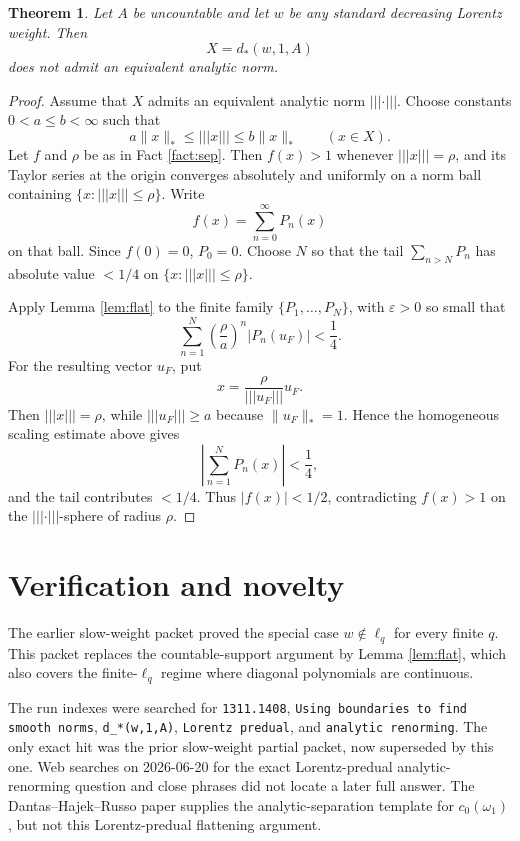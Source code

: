 \documentclass[11pt]{article}
\newtheorem{theorem}{Theorem}
\newcommand{\eps}{\varepsilon}
\newcommand{\vertiii}[1]{|\!|\!|#1|\!|\!|}
\begin{document}
\begin{theorem}\label{thm:main}
Let \(A\) be uncountable and let \(w\) be any standard decreasing Lorentz
weight.  Then
\[
  X=d_*(w,1,A)
\]
does not admit an equivalent analytic norm.
\end{theorem}

\begin{proof}
Assume that \(X\) admits an equivalent analytic norm \(\vertiii{\cdot}\).
Choose constants \(0<a\le b<\infty\) such that
\[
  a\|x\|_*\le \vertiii{x}\le b\|x\|_* \qquad(x\in X).
\]
Let \(f\) and \(\rho\) be as in Fact \ref{fact:sep}.  Then \(f(x)>1\) whenever
\(\vertiii{x}=\rho\), and its Taylor series at the origin converges absolutely
and uniformly on a norm ball containing \(\{x:\vertiii{x}\le\rho\}\).
Write
\[
  f(x)=\sum_{n=0}^\infty P_n(x)
\]
on that ball.  Since \(f(0)=0\), \(P_0=0\).  Choose \(N\) so that the tail
\(\sum_{n>N}P_n\) has absolute value \(<1/4\) on
\(\{x:\vertiii{x}\le\rho\}\).

Apply Lemma \ref{lem:flat} to the finite family
\(\{P_1,\ldots,P_N\}\), with \(\eps>0\) so small that
\[
  \sum_{n=1}^N
  \left(\frac{\rho}{a}\right)^n |P_n(u_F)|<\frac14 .
\]
For the resulting vector \(u_F\), put
\[
  x=\frac{\rho}{\vertiii{u_F}}u_F .
\]
Then \(\vertiii{x}=\rho\), while \(\vertiii{u_F}\ge a\) because
\(\|u_F\|_*=1\).  Hence the homogeneous scaling estimate above gives
\[
  \left|\sum_{n=1}^N P_n(x)\right|<\frac14,
\]
and the tail contributes \(<1/4\).  Thus \(|f(x)|<1/2\), contradicting
\(f(x)>1\) on the \(\vertiii{\cdot}\)-sphere of radius \(\rho\).
\end{proof}

\section{Verification and novelty}

The earlier slow-weight packet proved the special case
\(w\notin\ell_q\) for every finite \(q\).  This packet replaces the
countable-support argument by Lemma \ref{lem:flat}, which also covers the
finite-\(\ell_q\) regime where diagonal polynomials are continuous.

The run indexes were searched for \texttt{1311.1408}, \texttt{Using
boundaries to find smooth norms}, \texttt{d\_*(w,1,A)}, \texttt{Lorentz
predual}, and \texttt{analytic renorming}.  The only exact hit was the prior
slow-weight partial packet, now superseded by this one.  Web searches on
2026-06-20 for the exact Lorentz-predual analytic-renorming question and close
phrases did not locate a later full answer.  The Dantas--Hajek--Russo paper
\cite{dantas-hajek-russo} supplies the analytic-separation template for
\(c_0(\omega_1)\), but not this Lorentz-predual flattening argument.
\end{document}
